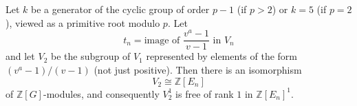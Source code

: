 Let $k$ be a generator of the cyclic group of order $p-1$ (if $p > 2$) or $k = 5$ (if $p = 2$), viewed as a primitive root modulo $p$. Let
$$
t_n = \text{image of } \frac{v^a - 1}{v - 1} \text{ in } V_n
$$
and let $V_2$ be the subgroup of $V_1$ represented by elements of the form $(v^a - 1)/(v - 1)$ (not just positive). Then there is an isomorphism
$$
V_2 \cong \mathbb{Z}[E_n]
$$
of $\mathbb{Z}[G]$-modules, and consequently $V_2^1$ is free of rank $1$ in $\mathbb{Z}[E_n]^1$.
